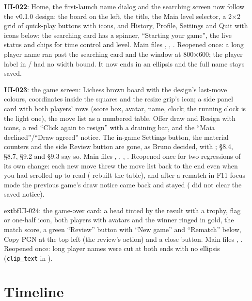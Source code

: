 \documentclass[11pt,a4paper]{article}
\begin{document}
\textbf{UI-022}: Home, the first-launch name dialog and the searching screen now follow the
v0.1.0 design: the board on the left, the title, the Maia level selector, a 2$\times$2 grid of
quick-play buttons with icons, and History, Profile, Settings and Quit with icons below; the
searching card has a spinner, ``Starting your game'', the live status and chips for time control
and level. Main files , , .
Reopened once: a long player name ran past the searching card and the window at 800$\times$600;
the player label in / had no width bound. It now
ends in an ellipsis and the full name stays saved.

\textbf{UI-023}: the game screen: Lichess brown board with the design's last-move colours,
coordinates inside the squares and the resize grip's icon; a side panel card with both players'
rows (score box, avatar, name, clock; the running clock is the light one), the move list as a
numbered table, Offer draw and Resign with icons, a red ``Click again to resign'' with a draining
bar, and the ``Maia declined''/``Draw agreed'' notice. The in-game Settings button, the material
counters and the side Review button are gone, as Bruno decided, with ;
 §8.4, §8.7, §9.2 and §9.3 say so. Main files ,
, , . Reopened once for two
regressions of its own change: each new move threw the move list back to the end even when you
had scrolled up to read ( rebuilt the table), and after a rematch in F11
focus mode the previous game's draw notice came back and stayed ( did not clear
the saved notice).

	extbf{UI-024}: the game-over card: a head tinted by the result with a trophy, flag or one-half icon, both
players with avatars and the winner ringed in gold, the match score, a green ``Review'' button
with ``New game'' and ``Rematch'' below, Copy PGN at the top left (the review's action) and a
close button. Main files , . Reopened once: long
player names were cut at both ends with no ellipsis (\texttt{clip\_text} in
).

\section*{Timeline}
\end{document}
